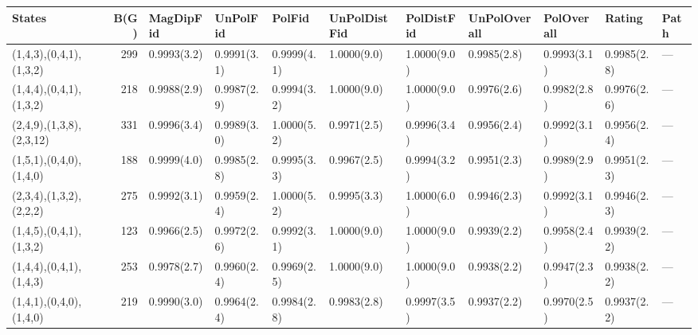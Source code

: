 \begin{tabular}{lrlllllllll}
\hline
 States                   &   B(G) & MagDipFid   & UnPolFid    & PolFid      & UnPolDistFid   & PolDistFid   & UnPolOverall   & PolOverall   & Rating      & Path   \\
\hline
 (1,4,3),(0,4,1),(1,3,2)  &    299 & 0.9993(3.2) & 0.9991(3.1) & 0.9999(4.1) & 1.0000(9.0)    & 1.0000(9.0)  & 0.9985(2.8)    & 0.9993(3.1)  & 0.9985(2.8) & ---    \\
 (1,4,4),(0,4,1),(1,3,2)  &    218 & 0.9988(2.9) & 0.9987(2.9) & 0.9994(3.2) & 1.0000(9.0)    & 1.0000(9.0)  & 0.9976(2.6)    & 0.9982(2.8)  & 0.9976(2.6) & ---    \\
 (2,4,9),(1,3,8),(2,3,12) &    331 & 0.9996(3.4) & 0.9989(3.0) & 1.0000(5.2) & 0.9971(2.5)    & 0.9996(3.4)  & 0.9956(2.4)    & 0.9992(3.1)  & 0.9956(2.4) & ---    \\
 (1,5,1),(0,4,0),(1,4,0)  &    188 & 0.9999(4.0) & 0.9985(2.8) & 0.9995(3.3) & 0.9967(2.5)    & 0.9994(3.2)  & 0.9951(2.3)    & 0.9989(2.9)  & 0.9951(2.3) & ---    \\
 (2,3,4),(1,3,2),(2,2,2)  &    275 & 0.9992(3.1) & 0.9959(2.4) & 1.0000(5.2) & 0.9995(3.3)    & 1.0000(6.0)  & 0.9946(2.3)    & 0.9992(3.1)  & 0.9946(2.3) & ---    \\
 (1,4,5),(0,4,1),(1,3,2)  &    123 & 0.9966(2.5) & 0.9972(2.6) & 0.9992(3.1) & 1.0000(9.0)    & 1.0000(9.0)  & 0.9939(2.2)    & 0.9958(2.4)  & 0.9939(2.2) & ---    \\
 (1,4,4),(0,4,1),(1,4,3)  &    253 & 0.9978(2.7) & 0.9960(2.4) & 0.9969(2.5) & 1.0000(9.0)    & 1.0000(9.0)  & 0.9938(2.2)    & 0.9947(2.3)  & 0.9938(2.2) & ---    \\
 (1,4,1),(0,4,0),(1,4,0)  &    219 & 0.9990(3.0) & 0.9964(2.4) & 0.9984(2.8) & 0.9983(2.8)    & 0.9997(3.5)  & 0.9937(2.2)    & 0.9970(2.5)  & 0.9937(2.2) & ---    \\
\hline
\end{tabular}